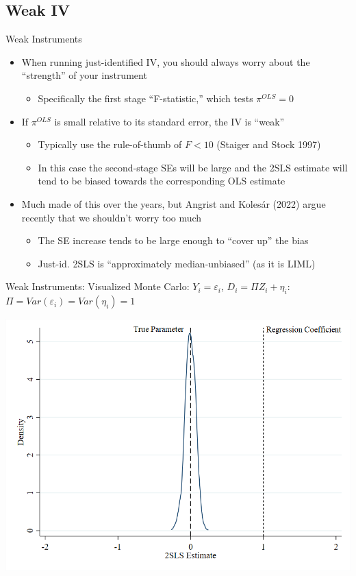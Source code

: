 \documentclass{beamer}
\begin{document}
\subsection{Weak IV}
\begin{frame}{Weak Instruments}
\begin{itemize}
\item When running just-identified IV, you should always worry about the ``strength'' of your instrument\smallskip
\begin{itemize}
\item Specifically the first stage ``F-statistic,'' which tests $\pi^{OLS}=0$ 
\end{itemize}\bigskip\pause{}
\item If $\pi^{OLS}$ is small relative to its standard error, the IV is ``weak''\smallskip
\begin{itemize}
\item Typically use the rule-of-thumb of $F<10$ (Staiger and Stock 1997)\smallskip
\item In this case the second-stage SEs will be large and the 2SLS estimate will tend to be biased towards the corresponding OLS estimate
\end{itemize}\bigskip\pause{}
\item Much made of this over the years, but Angrist and Koles\'{a}r (2022) argue recently that we shouldn't worry too much\smallskip
\begin{itemize}
\item The SE increase tends to be large enough to ``cover up'' the bias\smallskip
\item Just-id. 2SLS is ``approximately median-unbiased'' (as it is LIML)
\end{itemize}
\end{itemize}
\end{frame}

\begin{frame}{Weak Instruments: Visualized}
Monte Carlo: $Y_i=\varepsilon_i$, $D_i=\Pi Z_i+\eta_i$: $\Pi=Var(\varepsilon_i)=Var(\eta_i)=1$
\begin{center}
\includegraphics[scale=0.45]{./lecture_includes/strongpi.png}
\end{center}

\end{frame}
\end{document}
